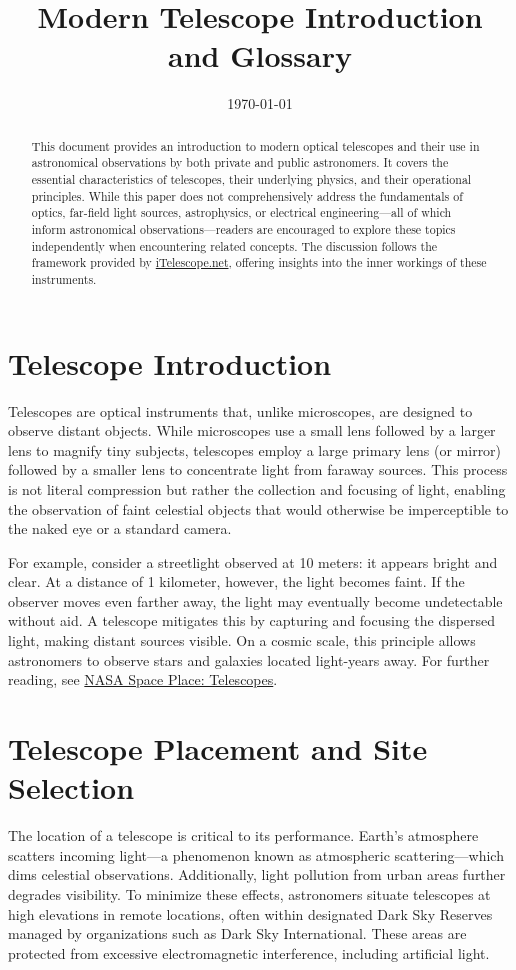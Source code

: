 \documentclass[12pt,oneside,a4paper,english]{article}
\author{}
\title{\textbf{Modern Telescope Introduction and Glossary}}
\date{\today}
\begin{document}
\maketitle

\begin{abstract}
This document provides an introduction to modern optical telescopes and their use in astronomical observations by both private and public astronomers. It covers the essential characteristics of telescopes, their underlying physics, and their operational principles. While this paper does not comprehensively address the fundamentals of optics, far-field light sources, astrophysics, or electrical engineering—all of which inform astronomical observations—readers are encouraged to explore these topics independently when encountering related concepts. The discussion follows the framework provided by \href{itelescope.net}{iTelescope.net}, offering insights into the inner workings of these instruments.
\end{abstract}

\section{Telescope Introduction}
Telescopes are optical instruments that, unlike microscopes, are designed to observe distant objects. While microscopes use a small lens followed by a larger lens to magnify tiny subjects, telescopes employ a large primary lens (or mirror) followed by a smaller lens to concentrate light from faraway sources. This process is not literal compression but rather the collection and focusing of light, enabling the observation of faint celestial objects that would otherwise be imperceptible to the naked eye or a standard camera. 

For example, consider a streetlight observed at 10 meters: it appears bright and clear. At a distance of 1 kilometer, however, the light becomes faint. If the observer moves even farther away, the light may eventually become undetectable without aid. A telescope mitigates this by capturing and focusing the dispersed light, making distant sources visible. On a cosmic scale, this principle allows astronomers to observe stars and galaxies located light-years away. For further reading, see \href{https://spaceplace.nasa.gov/telescopes/en/}{NASA Space Place: Telescopes}.

\section{Telescope Placement and Site Selection}
The location of a telescope is critical to its performance. Earth's atmosphere scatters incoming light—a phenomenon known as atmospheric scattering—which dims celestial observations. Additionally, light pollution from urban areas further degrades visibility. To minimize these effects, astronomers situate telescopes at high elevations in remote locations, often within designated Dark Sky Reserves managed by organizations such as Dark Sky International. These areas are protected from excessive electromagnetic interference, including artificial light.
\end{document}
